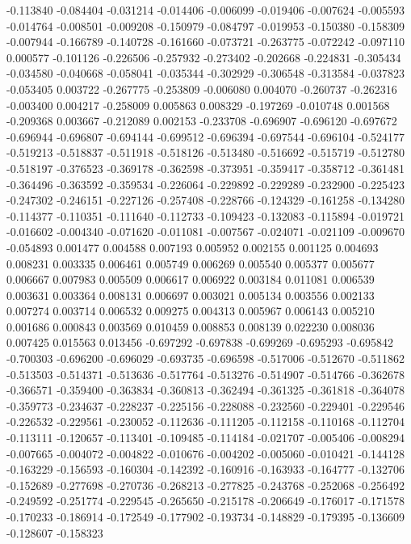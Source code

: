 -0.113840
-0.084404
-0.031214
-0.014406
-0.006099
-0.019406
-0.007624
-0.005593
-0.014764
-0.008501
-0.009208
-0.150979
-0.084797
-0.019953
-0.150380
-0.158309
-0.007944
-0.166789
-0.140728
-0.161660
-0.073721
-0.263775
-0.072242
-0.097110
0.000577
-0.101126
-0.226506
-0.257932
-0.273402
-0.202668
-0.224831
-0.305434
-0.034580
-0.040668
-0.058041
-0.035344
-0.302929
-0.306548
-0.313584
-0.037823
-0.053405
0.003722
-0.267775
-0.253809
-0.006080
0.004070
-0.260737
-0.262316
-0.003400
0.004217
-0.258009
0.005863
0.008329
-0.197269
-0.010748
0.001568
-0.209368
0.003667
-0.212089
0.002153
-0.233708
-0.696907
-0.696120
-0.697672
-0.696944
-0.696807
-0.694144
-0.699512
-0.696394
-0.697544
-0.696104
-0.524177
-0.519213
-0.518837
-0.511918
-0.518126
-0.513480
-0.516692
-0.515719
-0.512780
-0.518197
-0.376523
-0.369178
-0.362598
-0.373951
-0.359417
-0.358712
-0.361481
-0.364496
-0.363592
-0.359534
-0.226064
-0.229892
-0.229289
-0.232900
-0.225423
-0.247302
-0.246151
-0.227126
-0.257408
-0.228766
-0.124329
-0.161258
-0.134280
-0.114377
-0.110351
-0.111640
-0.112733
-0.109423
-0.132083
-0.115894
-0.019721
-0.016602
-0.004340
-0.071620
-0.011081
-0.007567
-0.024071
-0.021109
-0.009670
-0.054893
0.001477
0.004588
0.007193
0.005952
0.002155
0.001125
0.004693
0.008231
0.003335
0.006461
0.005749
0.006269
0.005540
0.005377
0.005677
0.006667
0.007983
0.005509
0.006617
0.006922
0.003184
0.011081
0.006539
0.003631
0.003364
0.008131
0.006697
0.003021
0.005134
0.003556
0.002133
0.007274
0.003714
0.006532
0.009275
0.004313
0.005967
0.006143
0.005210
0.001686
0.000843
0.003569
0.010459
0.008853
0.008139
0.022230
0.008036
0.007425
0.015563
0.013456
-0.697292
-0.697838
-0.699269
-0.695293
-0.695842
-0.700303
-0.696200
-0.696029
-0.693735
-0.696598
-0.517006
-0.512670
-0.511862
-0.513503
-0.514371
-0.513636
-0.517764
-0.513276
-0.514907
-0.514766
-0.362678
-0.366571
-0.359400
-0.363834
-0.360813
-0.362494
-0.361325
-0.361818
-0.364078
-0.359773
-0.234637
-0.228237
-0.225156
-0.228088
-0.232560
-0.229401
-0.229546
-0.226532
-0.229561
-0.230052
-0.112636
-0.111205
-0.112158
-0.110168
-0.112704
-0.113111
-0.120657
-0.113401
-0.109485
-0.114184
-0.021707
-0.005406
-0.008294
-0.007665
-0.004072
-0.004822
-0.010676
-0.004202
-0.005060
-0.010421
-0.144128
-0.163229
-0.156593
-0.160304
-0.142392
-0.160916
-0.163933
-0.164777
-0.132706
-0.152689
-0.277698
-0.270736
-0.268213
-0.277825
-0.243768
-0.252068
-0.256492
-0.249592
-0.251774
-0.229545
-0.265650
-0.215178
-0.206649
-0.176017
-0.171578
-0.170233
-0.186914
-0.172549
-0.177902
-0.193734
-0.148829
-0.179395
-0.136609
-0.128607
-0.158323

